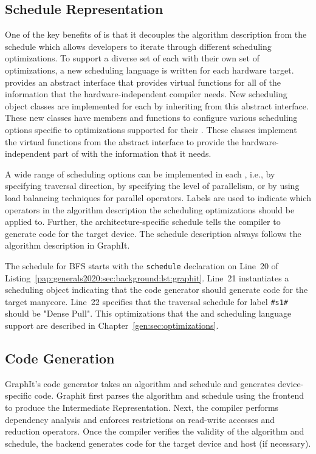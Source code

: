 \subsection{Schedule Representation}
One of the key benefits of \graphit is that it decouples the algorithm description from the schedule which allows developers to iterate through different scheduling optimizations. 
To support a diverse set of \graphvms each with their own set of optimizations, a new scheduling language is written for each hardware target. 
\GG provides an abstract interface that provides virtual functions for all of the information that the hardware-independent compiler needs.
New scheduling object classes are implemented for each \graphvm by inheriting from this abstract interface. 
These new classes have members and functions to configure various scheduling options specific to optimizations supported for their \graphvms. 
These classes implement the virtual functions from the abstract interface to provide the hardware-independent part of \GG with the information that it needs.

A wide range of scheduling options can be implemented in each \graphvm, i.e., by specifying traversal direction, by specifying the level of parallelism, or by using load balancing techniques for parallel operators.
Labels are used to indicate which operators in the algorithm description the scheduling optimizations should be applied to.
Further, the architecture-specific schedule tells the compiler to generate code for the target device.
The schedule description always follows the algorithm description in GraphIt.

The schedule for BFS starts with the \lstinline[language=graphit]{schedule} declaration on Line~20 of Listing~\ref{pap:generals2020:sec:background:lst:graphit}. 
Line~21 instantiates a \hb scheduling object indicating that the code generator should generate code for the target manycore. 
Line~22 specifies that the traversal schedule for label \lstinline[language=graphit]{#s1#} should be "Dense Pull". 
This optimizations that the \hb \graphvm and scheduling language support are described in Chapter~\ref{gen:sec:optimizations}. 

\subsection{Code Generation}
GraphIt's code generator takes an algorithm and schedule and generates device-specific code.
Graphit first parses the algorithm and schedule using the frontend to produce the Intermediate Representation. 
Next, the compiler performs dependency analysis and enforces restrictions on read-write accesses and reduction operators. 
Once the compiler verifies the validity of the algorithm and schedule, the backend generates code for the target device and host (if necessary).

